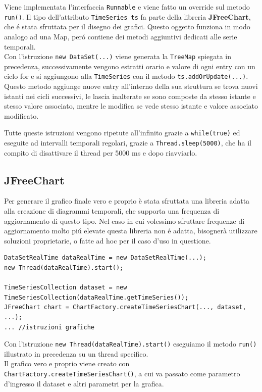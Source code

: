 Viene implementata l'interfaccia \texttt{Runnable} e viene fatto un override sul metodo \texttt{run()}.
Il tipo dell'attributo \texttt{TimeSeries ts} fa parte della libreria \textbf{JFreeChart}, che é stata sfruttata per il disegno dei grafici.
Questo oggetto funziona in modo analogo ad una Map, peró contiene dei metodi aggiuntivi dedicati alle serie temporali.\\
Con l'istruzione \texttt{new DataSet(...)} viene generata la \texttt{TreeMap} spiegata in precedenza, successivamente
vengono estratti orario e valore di ogni entry con un ciclo for e si aggiungono alla \texttt{TimeSeries} con
il metodo \texttt{ts.addOrUpdate(...)}.
Questo metodo aggiunge nuove entry all'interno della sua struttura se trova nuovi istanti nei cicli successivi,
le lascia inalterate se sono composte da stesso istante e stesso valore associato, mentre le modifica se vede stesso istante e valore associato
modificato.

Tutte queste istruzioni vengono ripetute all'infinito grazie a \texttt{while(true)} ed eseguite ad intervalli temporali regolari,
grazie a \texttt{Thread.sleep(5000)}, che ha il compito di disattivare il thread per 5000 ms e dopo riavviarlo.


\subsection{JFreeChart}
Per generare il grafico finale vero e proprio è stata sfruttata una libreria adatta alla creazione di diagrammi temporali, che supporta una frequenza di
aggiornamento di questo tipo.
Nel caso in cui volessimo sfruttare frequenze di aggiornamento molto piú elevate questa libreria non é adatta,
bisognerà utilizzare soluzioni proprietarie, o fatte ad hoc per il caso d'uso in questione.

\begin{lstlisting}[autogobble, title={\texttt{DataSetRealTime.java}}]
DataSetRealTime dataRealTime = new DataSetRealTime(...);
new Thread(dataRealTime).start();

TimeSeriesCollection dataset = new TimeSeriesCollection(dataRealTime.getTimeSeries());
JFreeChart chart = ChartFactory.createTimeSeriesChart(..., dataset, ...);
... //istruzioni grafiche
\end{lstlisting}

Con l'istruzione \texttt{new Thread(dataRealTime).start()} eseguiamo il metodo \texttt{run()}
illustrato in precedenza su un thread specifico.\\
Il grafico vero e proprio viene creato con \texttt{ChartFactory.createTimeSeriesChart()}, a cui
va passato come parametro d'ingresso il dataset e altri parametri per la grafica.

